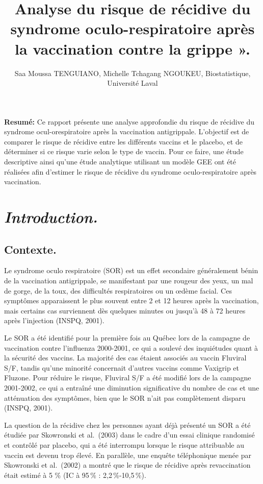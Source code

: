 \documentclass[
]{article}
\title{Analyse du risque de récidive du syndrome oculo-respiratoire
après la vaccination contre la grippe ».}
\author{Saa Moussa TENGUIANO, Michelle Tchagang NGOUKEU, Biostatistique,
Université Laval}
\date{}
\begin{document}
\maketitle

{
\setcounter{tocdepth}{2}
\tableofcontents
}
\textbf{Resumé:} Ce rapport présente une analyse approfondie du risque
de récidive du syndrome ocul-orespiratoire après la vaccination
antigrippale. L'objectif est de comparer le risque de récidive entre les
différents vaccins et le placebo, et de déterminer si ce risque varie
selon le type de vaccin. Pour ce faire, une étude descriptive ainsi
qu'une étude analytique utilisant un modèle GEE ont été réalisées afin
d'estimer le risque de récidive du syndrome oculo-respiratoire après
vaccination.

\section{\texorpdfstring{\emph{Introduction.}}{Introduction.}}\label{introduction.}

\subsection{Contexte.}\label{contexte.}

Le syndrome oculo respiratoire (SOR) est un effet secondaire
généralement bénin de la vaccination antigrippale, se manifestant par
une rougeur des yeux, un mal de gorge, de la toux, des difficultés
respiratoires ou un œdème facial. Ces symptômes apparaissent le plus
souvent entre 2 et 12 heures après la vaccination, mais certains cas
surviennent dès quelques minutes ou jusqu'à 48 à 72 heures après
l'injection (INSPQ, 2001).

Le SOR a été identifié pour la première fois au Québec lors de la
campagne de vaccination contre l'influenza 2000-2001, ce qui a soulevé
des inquiétudes quant à la sécurité des vaccins. La majorité des cas
étaient associés au vaccin Fluviral S/F, tandis qu'une minorité
concernait d'autres vaccins comme Vaxigrip et Fluzone. Pour réduire le
risque, Fluviral S/F a été modifié lors de la campagne 2001-2002, ce qui
a entraîné une diminution significative du nombre de cas et une
atténuation des symptômes, bien que le SOR n'ait pas complètement
disparu (INSPQ, 2001).

La question de la récidive chez les personnes ayant déjà présenté un SOR
a été étudiée par Skowronski et al.~(2003) dans le cadre d'un essai
clinique randomisé et contrôlé par placebo, qui a été interrompu lorsque
le risque attribuable au vaccin est devenu trop élevé. En parallèle, une
enquête téléphonique menée par Skowronski et al.~(2002) a montré que le
risque de récidive après revaccination était estimé à 5 \% (IC à 95\,\%
: 2,2\,\%-10,5\,\%).
\end{document}
